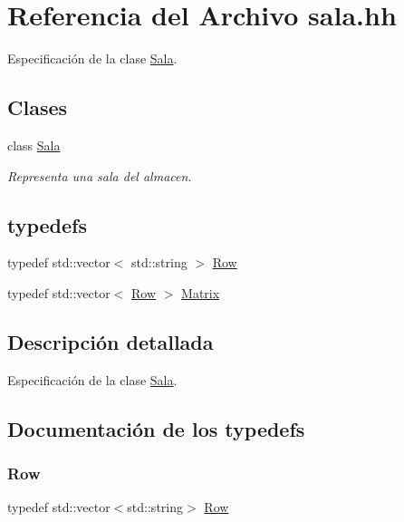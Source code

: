 \hypertarget{sala_8hh}{}\section{Referencia del Archivo sala.\+hh}
\label{sala_8hh}


Especificación de la clase \mbox{\hyperlink{class_sala}{Sala}}.  


\subsection*{Clases}
\begin{DoxyCompactItemize}
\item 
class \mbox{\hyperlink{class_sala}{Sala}}
\begin{DoxyCompactList}\small\item\em Representa una sala del almacen. \end{DoxyCompactList}\end{DoxyCompactItemize}
\subsection*{typedefs}
\begin{DoxyCompactItemize}
\item 
typedef std\+::vector$<$ std\+::string $>$ \mbox{\hyperlink{sala_8hh_aa33775a3e721e5fbd17b48a94ed3ca94}{Row}}
\item 
typedef std\+::vector$<$ \mbox{\hyperlink{sala_8hh_aa33775a3e721e5fbd17b48a94ed3ca94}{Row}} $>$ \mbox{\hyperlink{sala_8hh_a274a66ac4d9c777e113af0a65bb3912a}{Matrix}}
\end{DoxyCompactItemize}


\subsection{Descripción detallada}
Especificación de la clase \mbox{\hyperlink{class_sala}{Sala}}. 



\subsection{Documentación de los \textquotesingle{}typedefs\textquotesingle{}}
\mbox{\label{sala_8hh_aa33775a3e721e5fbd17b48a94ed3ca94}} 
\subsubsection{\texorpdfstring{Row}{Row}}
{\footnotesize\ttfamily typedef std\+::vector$<$std\+::string$>$ \mbox{\hyperlink{sala_8hh_aa33775a3e721e5fbd17b48a94ed3ca94}{Row}}}



